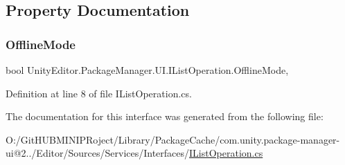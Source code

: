 \subsection{Property Documentation}
\mbox{\label{interface_unity_editor_1_1_package_manager_1_1_u_i_1_1_i_list_operation_a617251544db29ab44bbee294c1ccce91}} 
\subsubsection{\texorpdfstring{OfflineMode}{OfflineMode}}
{\footnotesize\ttfamily bool Unity\+Editor.\+Package\+Manager.\+U\+I.\+I\+List\+Operation.\+Offline\+Mode\hspace{0.3cm}{\ttfamily [get]}, {\ttfamily [set]}}



Definition at line 8 of file I\+List\+Operation.\+cs.



The documentation for this interface was generated from the following file\+:\begin{DoxyCompactItemize}
\item 
O\+:/\+Git\+H\+U\+B\+M\+I\+N\+I\+P\+Roject/\+Library/\+Package\+Cache/com.\+unity.\+package-\/manager-\/ui@2../\+Editor/\+Sources/\+Services/\+Interfaces/\mbox{\hyperlink{_i_list_operation_8cs}{I\+List\+Operation.\+cs}}\end{DoxyCompactItemize}
